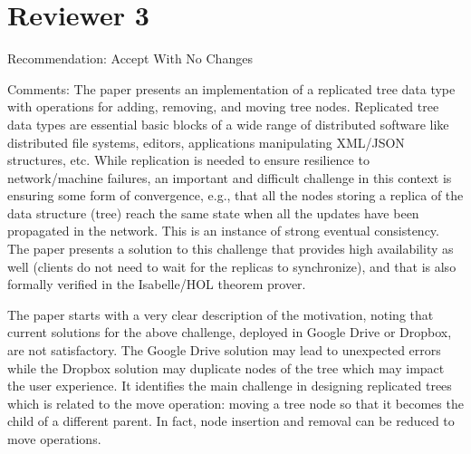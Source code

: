 \documentclass[10pt]{article}
\begin{document}
\section{Reviewer 3}

\begin{spverbatim}
Recommendation: Accept With No Changes

Comments:
The paper presents an implementation of a replicated tree data type with operations for adding, removing, and moving tree nodes. Replicated tree data types are essential basic blocks of a wide range of distributed software like distributed file systems, editors, applications manipulating XML/JSON structures, etc. While replication is needed to ensure resilience to network/machine failures, an important and difficult challenge in this context is ensuring some form of convergence, e.g., that all the nodes storing a replica of the data structure (tree) reach the same state when all the updates have been propagated in the network. This is an instance of strong eventual consistency. The paper presents a solution to this challenge that provides high availability as well (clients do not need to wait for the replicas to synchronize), and that is also formally verified in the Isabelle/HOL theorem prover.

The paper starts with a very clear description of the motivation, noting that current solutions for the above challenge, deployed in Google Drive or Dropbox, are not satisfactory. The Google Drive solution may lead to unexpected errors while the Dropbox solution may duplicate nodes of the tree which may impact the user experience. It identifies the main challenge in designing replicated trees which is related to the move operation: moving a tree node so that it becomes the child of a different parent. In fact, node insertion and removal can be reduced to move operations.


\end{spverbatim}
\end{document}
